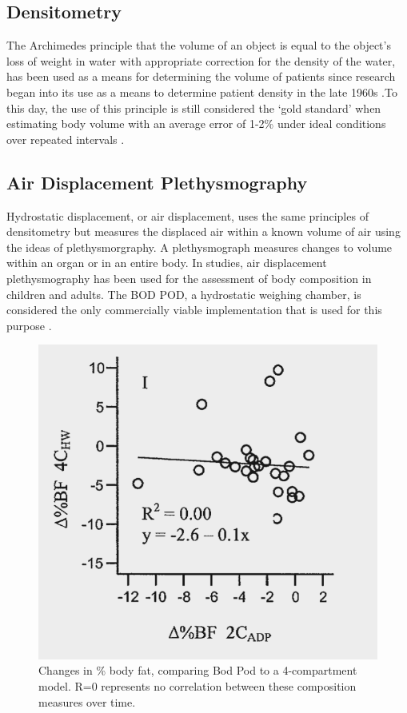 \subsection{Densitometry}

The Archimedes principle that the volume of an object is equal to the object's loss of weight in water with appropriate correction for the density of the water, has been used as a means for determining the volume of patients since research began into its use as a means to determine patient density in the late 1960s \cite{katch1967} .To this day, the use of this principle is still considered the `gold standard' \cite{anderson2012} when estimating body volume with an average error of 1-2\% under ideal conditions over repeated intervals \cite{Rolland2012}. \\

\subsection{Air Displacement Plethysmography}

Hydrostatic displacement, or air displacement, uses the same principles of densitometry but measures the displaced air within a known volume of air using the ideas of plethysmorgraphy. A plethysmograph measures changes to volume within an organ or in an entire body. In studies, air displacement plethysmography has been used for the assessment of body composition in children and adults. The BOD POD, a hydrostatic weighing chamber, is considered the only commercially viable implementation that is used for this purpose \cite{Fields2004}. \\

\begin{figure}[t]
\label{2c4cerror}
    \centering
    \includegraphics[scale=0.4]{images/2c4cgraph.png}
	\caption[Changes in \% body fat, comparing Bod Pod to a 4-compartment model]{Changes in \% body fat, comparing Bod Pod to a 4-compartment model. R=0 represents no correlation between these composition measures over time.}
\end{figure}

